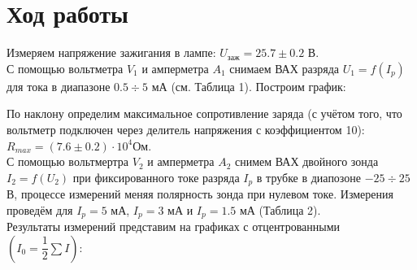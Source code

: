 \documentclass[a4paper,12pt]{article}
\begin{document}
\section*{Ход работы}
Измеряем напряжение зажигания в лампе: $U_{\text{заж}} = 25.7\pm 0.2$ В.\\
С помощью вольтметра $V_1$ и амперметра $A_1$ снимаем ВАХ разряда $U_1=f(I_p)$ для тока в диапазоне $0.5 \div 5$ мА (см. Таблица 1).
Построим график:\\

\begin{center}
\end{center}

По наклону определим максимальное сопротивление заряда (с учётом того, что вольтметр подключен через делитель напряжения с коэффициентом 10): $R_{max} = (7.6\pm 0.2)\cdot 10^4\text{Ом}$.\\
С помощью вольтмертра $V_2$ и амперметра $A_2$ снимем ВАХ двойного зонда $I_2 = f(U_2)$ при фиксированного токе разряда $I_p$ в трубке в диапозоне $-25 \div 25$ В, процессе измерений меняя полярность зонда при нулевом токе. Измерения проведём для $I_p = 5$ мА, $I_p = 3$ мА  и $I_p = 1.5$ мА (Таблица 2).\\
Результаты измерений представим на графиках с отцентрованными $\left(I_0 = \dfrac{1}{2}\sum I\right)$:
\newpage
\end{document}
